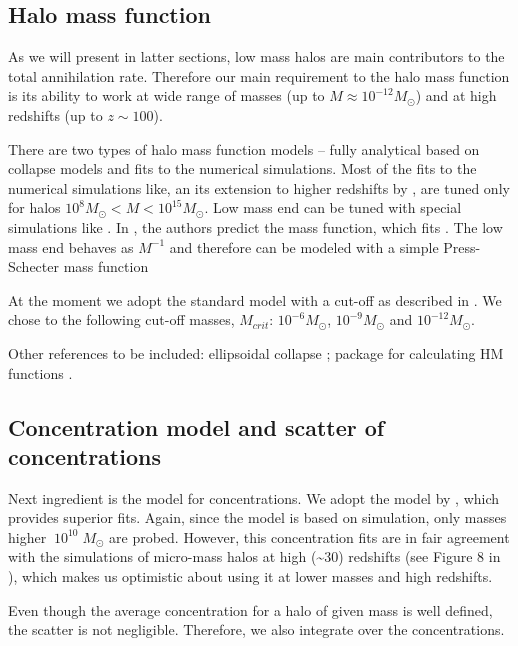 \subsection{Halo mass function}

As we will present in latter sections, low mass halos are main contributors to the total annihilation rate. Therefore our main requirement to the halo mass function is its ability to work at wide range of masses (up to $M \approx 10^{-12}M_\odot$) and at high redshifts (up to $z \sim 100$). 

There are two types of halo mass function models -- fully analytical based on collapse models and fits to the numerical simulations. Most of the fits to the numerical simulations like, \citet{Tinker_2008} an its extension to higher redshifts by \citet{Behroozi_2013}, are tuned only for halos $10^{8}M_\odot < M < 10^{15}M_\odot$. Low mass end can be tuned with special simulations like \citet{Diemand_2005}. In \citet{Schneider_2013}, the authors predict the mass function, which fits \citet{Diemand_2005}. The low mass end behaves as $M^{-1}$ and therefore can be modeled with a simple Press-Schecter mass function \citet{Press_1974}

At the moment we adopt the standard \citet{Press_1974} model with a cut-off as described in \citet{Diemand_2005}. We chose to the following cut-off masses, $M_{crit}$: $10^{-6}M_\odot$, $10^{-9}M_\odot$ and $10^{-12}M_\odot$.

Other references to be included:
ellipsoidal collapse \citep{Sheth_2001}; package for calculating HM functions \cite{Murray_2013}.

\subsection{Concentration model and scatter of concentrations}

Next ingredient is the model for concentrations. We adopt the model by \citet{Diemer_2015}, which provides superior fits. Again, since the model is based on simulation, only masses higher $~10^{10}\;M_\odot$ are probed. However, this concentration fits are in fair agreement with the simulations of micro-mass halos at high (\sim30) redshifts (see Figure 8 in \citet{Diemer_2015}), which makes us optimistic about using it at lower masses and high redshifts.

Even though the average concentration for a halo of given mass is well defined, the scatter is not negligible. Therefore, we also integrate over the concentrations.

